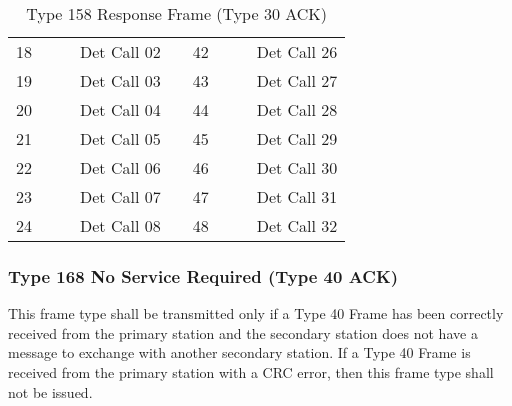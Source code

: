 \documentclass[]{article}
\begin{document}
\begin{landscape}
\begin{table}[]
\begin{tabular}{lllllllll}
			18           &                                                                     &                & Det Call 02                     &                   & 42           &                     &                & Det Call 26       \\
			19           &                                                                     &                & Det Call 03                     &                   & 43           &                     &                & Det Call 27       \\
			20           &                                                                     &                & Det Call 04                     &                   & 44           &                     &                & Det Call 28       \\
			21           &                                                                     &                & Det Call 05                     &                   & 45           &                     &                & Det Call 29       \\
			22           &                                                                     &                & Det Call 06                     &                   & 46           &                     &                & Det Call 30       \\
			23           &                                                                     &                & Det Call 07                     &                   & 47           &                     &                & Det Call 31       \\
			24           &                                                                     &                & Det Call 08                     &                   & 48           &                     &                & Det Call 32       \\ \cline{1-4} \cline{6-9} 
		\end{tabular}
		\caption{Type 158 Response Frame (Type 30 ACK)}
		\label{tab:type-158-frame}
	\end{table}
\end{landscape}

\clearpage

\subsubsection{Type 168 No Service Required (Type 40 ACK)}
This frame type shall be transmitted only if a Type 40 Frame has been correctly received from the primary station and the secondary station does not have a message to exchange with another secondary station. If a Type 40 Frame is received from the primary station with a CRC error, then this frame type shall not be issued.
\end{document}
